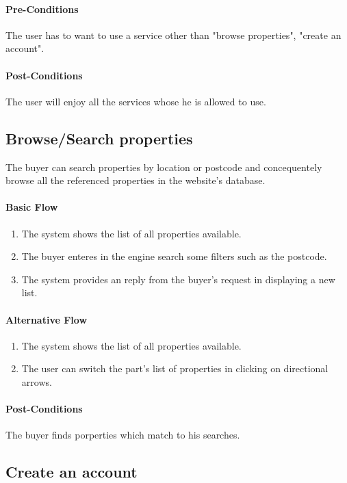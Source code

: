 \documentclass[a4paper,12pt]{article}
\begin{document}
\paragraph{Pre-Conditions}
The user has to want to use a service other than "browse properties", "create an account".
\paragraph{Post-Conditions}
The user will enjoy all the services whose he is allowed to use.

\subsection{Browse/Search properties}

The buyer can search properties by location or postcode and concequentely browse all the referenced properties in the website's database.

\paragraph{Basic Flow}
\begin{enumerate}
\item The system shows the list of all properties available.
\item The buyer enteres in the engine search some filters such as the postcode.
\item The system provides an reply from the buyer's request in displaying a new list.
\end{enumerate}
\paragraph{Alternative Flow}
\begin{enumerate}
\item The system shows the list of all properties available.
\item The user can switch the part's list of properties in clicking on directional arrows.
\end{enumerate}
\paragraph{Post-Conditions}
The buyer finds porperties which match to his searches.

\subsection{Create an account}
\end{document}

